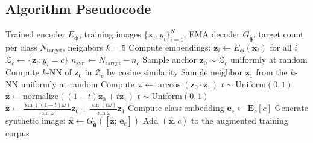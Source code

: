 \documentclass[12pt,letterpaper]{article}
\newcommand{\bz}{\mathbf{z}}
\newcommand{\bx}{\mathbf{x}}
\newcommand{\btheta}{\bm{\theta}}
\newcommand{\bphi}{\bm{\phi}}
\begin{document}
\subsection{Algorithm Pseudocode}

\begin{algorithm}[H]
\caption{SLERP-SMOTE Oversampling (Inference)}
\label{alg:slerp}
\begin{algorithmic}[1]
\Require Trained encoder $E_{\bphi}$, training images $\{\bx_i, y_i\}_{i=1}^N$,
         EMA decoder $G_{\tilde{\btheta}}$, target count per class $N_{\text{target}}$,
         neighbors $k=5$
\State Compute embeddings: $\bz_i \leftarrow E_{\bphi}(\bx_i)$ for all $i$
  \State $\mathcal{Z}_c \leftarrow \{\bz_i : y_i = c\}$
  \State $n_{\text{syn}} \leftarrow N_{\text{target}} - n_c$
    \State Sample anchor $\bz_0 \sim \mathcal{Z}_c$ uniformly at random
    \State Compute $k$-NN of $\bz_0$ in $\mathcal{Z}_c$ by cosine similarity
    \State Sample neighbor $\bz_1$ from the $k$-NN uniformly at random
    \State Compute $\omega \leftarrow \arccos(\bz_0 \cdot \bz_1)$
      \State $t \sim \text{Uniform}(0,1)$
      \State $\hat{\bz} \leftarrow \text{normalize}((1-t)\bz_0 + t\bz_1)$
    \Else
      \State $t \sim \text{Uniform}(0,1)$
      \State $\hat{\bz} \leftarrow \frac{\sin((1-t)\omega)}{\sin\omega}\bz_0
              + \frac{\sin(t\omega)}{\sin\omega}\bz_1$
    \EndIf
    \State Compute class embedding $\bm{e}_c \leftarrow \mathbf{E}_c[c]$
    \State Generate synthetic image: $\hat{\bx} \leftarrow G_{\tilde{\btheta}}([\hat{\bz};\,\bm{e}_c])$
    \State Add $(\hat{\bx}, c)$ to the augmented training corpus
  \EndFor
\EndFor
\end{algorithmic}
\end{algorithm}
\end{document}
